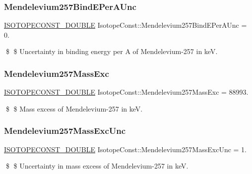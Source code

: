 \subsubsection{\texorpdfstring{Mendelevium257\+Bind\+E\+Per\+A\+Unc}{Mendelevium257BindEPerAUnc}}
{\footnotesize\ttfamily \mbox{\hyperlink{group___isotope_const-_macros_ga8f45a7272ce02c0b4c65c44636ed719a}{I\+S\+O\+T\+O\+P\+E\+C\+O\+N\+S\+T\+\_\+\+D\+O\+U\+B\+LE}} Isotope\+Const\+::\+Mendelevium257\+Bind\+E\+Per\+A\+Unc = 0.}

\$ \$ Uncertainty in binding energy per A of Mendelevium-\/257 in keV. \mbox{\label{group___isotope_const-_mendelevium-_md257_gae2ef466f85eb77cd00146b94f8117423}} 
\subsubsection{\texorpdfstring{Mendelevium257\+Mass\+Exc}{Mendelevium257MassExc}}
{\footnotesize\ttfamily \mbox{\hyperlink{group___isotope_const-_macros_ga8f45a7272ce02c0b4c65c44636ed719a}{I\+S\+O\+T\+O\+P\+E\+C\+O\+N\+S\+T\+\_\+\+D\+O\+U\+B\+LE}} Isotope\+Const\+::\+Mendelevium257\+Mass\+Exc = 88993.}

\$ \$ Mass excess of Mendelevium-\/257 in keV. \mbox{\label{group___isotope_const-_mendelevium-_md257_ga88e4a1282a2aecc1fa9b456a8abbe5fc}} 
\subsubsection{\texorpdfstring{Mendelevium257\+Mass\+Exc\+Unc}{Mendelevium257MassExcUnc}}
{\footnotesize\ttfamily \mbox{\hyperlink{group___isotope_const-_macros_ga8f45a7272ce02c0b4c65c44636ed719a}{I\+S\+O\+T\+O\+P\+E\+C\+O\+N\+S\+T\+\_\+\+D\+O\+U\+B\+LE}} Isotope\+Const\+::\+Mendelevium257\+Mass\+Exc\+Unc = 1.}

\$ \$ Uncertainty in mass excess of Mendelevium-\/257 in keV. \mbox{\label{group___isotope_const-_mendelevium-_md257_ga8eed0ea22b9aab0facb7229ac6b6a8be}} 

